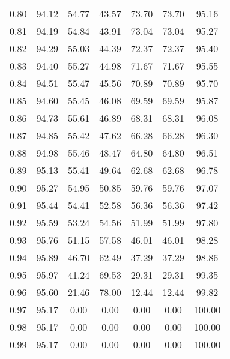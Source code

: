 \begin{tabular}{|c|c|c|c|c|c|c|}
      0.80 &     94.12 &     54.77 &      43.57 &   73.70 &      73.70 &         95.16 \\
      0.81 &     94.19 &     54.84 &      43.91 &   73.04 &      73.04 &         95.27 \\
      0.82 &     94.29 &     55.03 &      44.39 &   72.37 &      72.37 &         95.40 \\
      0.83 &     94.40 &     55.27 &      44.98 &   71.67 &      71.67 &         95.55 \\
      0.84 &     94.51 &     55.47 &      45.56 &   70.89 &      70.89 &         95.70 \\
      0.85 &     94.60 &     55.45 &      46.08 &   69.59 &      69.59 &         95.87 \\
      0.86 &     94.73 &     55.61 &      46.89 &   68.31 &      68.31 &         96.08 \\
      0.87 &     94.85 &     55.42 &      47.62 &   66.28 &      66.28 &         96.30 \\
      0.88 &     94.98 &     55.46 &      48.47 &   64.80 &      64.80 &         96.51 \\
      0.89 &     95.13 &     55.41 &      49.64 &   62.68 &      62.68 &         96.78 \\
      0.90 &     95.27 &     54.95 &      50.85 &   59.76 &      59.76 &         97.07 \\
      0.91 &     95.44 &     54.41 &      52.58 &   56.36 &      56.36 &         97.42 \\
      0.92 &     95.59 &     53.24 &      54.56 &   51.99 &      51.99 &         97.80 \\
      0.93 &     95.76 &     51.15 &      57.58 &   46.01 &      46.01 &         98.28 \\
      0.94 &     95.89 &     46.70 &      62.49 &   37.29 &      37.29 &         98.86 \\
      0.95 &     95.97 &     41.24 &      69.53 &   29.31 &      29.31 &         99.35 \\
      0.96 &     95.60 &     21.46 &      78.00 &   12.44 &      12.44 &         99.82 \\
      0.97 &     95.17 &      0.00 &       0.00 &    0.00 &       0.00 &        100.00 \\
      0.98 &     95.17 &      0.00 &       0.00 &    0.00 &       0.00 &        100.00 \\
      0.99 &     95.17 &      0.00 &       0.00 &    0.00 &       0.00 &        100.00 \\
\bottomrule
\end{tabular}
